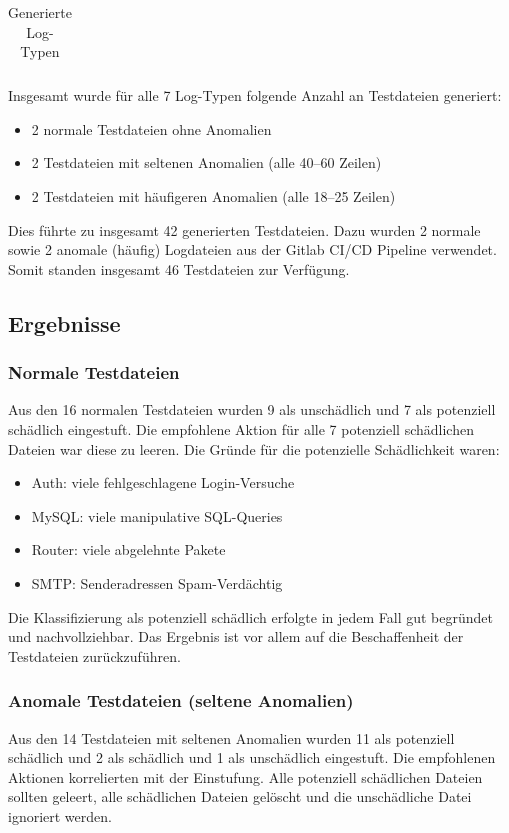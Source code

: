 \documentclass[a4paper,12pt]{report}
\begin{document}
\begin{table}[h!]
\begin{tabular}{|c|p{6cm}|p{6cm}|}
        \end{tabular}
        \caption{Generierte Log-Typen}\label{tab:generated-log-types}
    \end{table}

    \clearpage
    Insgesamt wurde für alle 7 Log-Typen folgende Anzahl an Testdateien generiert:
    \begin{itemize}
        \item 2 normale Testdateien ohne Anomalien
        \item 2 Testdateien mit seltenen Anomalien (alle 40--60 Zeilen)
        \item 2 Testdateien mit häufigeren Anomalien (alle 18--25 Zeilen)
    \end{itemize}
    Dies führte zu insgesamt 42 generierten Testdateien.
    Dazu wurden 2 normale sowie 2 anomale (häufig) Logdateien aus der Gitlab CI/CD Pipeline verwendet.
    Somit standen insgesamt 46 Testdateien zur Verfügung.

    \subsection{Ergebnisse}\label{subsec:ergebnisse}

    \subsubsection{Normale Testdateien}
    Aus den 16 normalen Testdateien wurden 9 als unschädlich und 7 als potenziell schädlich eingestuft.
    Die empfohlene Aktion für alle 7 potenziell schädlichen Dateien war diese zu leeren.
    Die Gründe für die potenzielle Schädlichkeit waren:
    \begin{itemize}
        \item Auth: viele fehlgeschlagene Login-Versuche
        \item MySQL: viele manipulative SQL-Queries
        \item Router: viele abgelehnte Pakete
        \item SMTP: Senderadressen Spam-Verdächtig
    \end{itemize}
    Die Klassifizierung als potenziell schädlich erfolgte in jedem Fall gut begründet und nachvollziehbar.
    Das Ergebnis ist vor allem auf die Beschaffenheit der Testdateien zurückzuführen.

    \subsubsection{Anomale Testdateien (seltene Anomalien)}
    Aus den 14 Testdateien mit seltenen Anomalien wurden 11 als potenziell schädlich und 2 als schädlich und 1 als unschädlich eingestuft.
    Die empfohlenen Aktionen korrelierten mit der Einstufung.
    Alle potenziell schädlichen Dateien sollten geleert, alle schädlichen Dateien gelöscht und die unschädliche Datei ignoriert werden.
\end{document}
